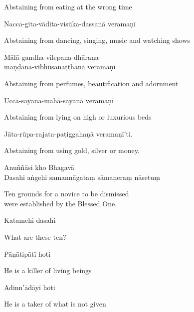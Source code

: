 \begin{english}
  Abstaining from eating at the wrong time
\end{english}

Nacca-gīta-vādita-visūka-dassanā veramaṇī

\begin{english}
  Abstaining from dancing, singing, music and watching shows
\end{english}

Mālā-gandha-vilepana-dhāraṇa-\\
\vin maṇḍana-vibhūsanaṭṭhānā veramaṇī

\begin{english}
  Abstaining from perfumes, beautification and adornment
\end{english}

Uccā-sayana-mahā-sayanā veramaṇī

\begin{english}
  Abstaining from lying on high or luxurious beds
\end{english}

Jāta-rūpa-rajata-paṭiggahaṇā veramaṇī'ti.

\begin{english}
  Abstaining from using gold, silver or money.
\end{english}


Anuññāsi kho Bhagavā\\
Dasahi aṅgehi samannāgataṃ sāmaṇeraṃ nāsetuṃ

\begin{english}
  Ten grounds for a novice to be dismissed\\
  were established by the Blessed One.
\end{english}

Katamehi dasahi

\begin{english}
  What are these ten?
\end{english}

Pāṇātipātī hoti

\begin{english}
  He is a killer of living beings
\end{english}

Adinn'ādāyī hoti

\begin{english}
  He is a taker of what is not given
\end{english}

